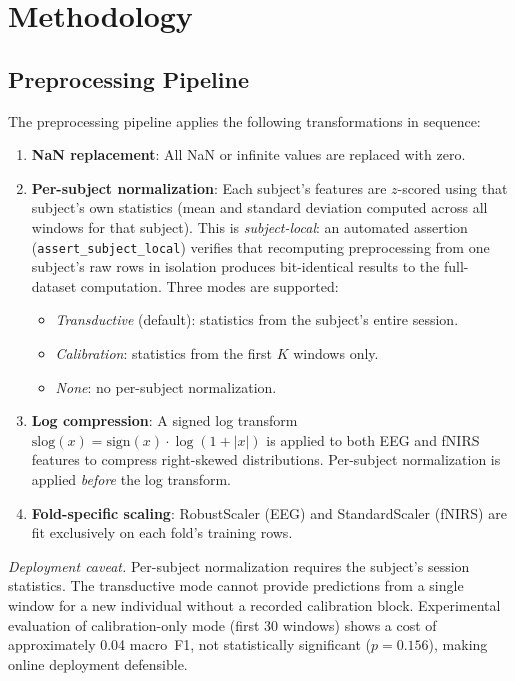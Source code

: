 \documentclass[conference]{IEEEtran}
\begin{document}
\section{Methodology}

\subsection{Preprocessing Pipeline}
The preprocessing pipeline applies the following transformations in sequence:
\begin{enumerate}
    \item \textbf{NaN replacement}: All NaN or infinite values are replaced with zero.
    \item \textbf{Per-subject normalization}: Each subject's features are $z$-scored using that subject's own statistics (mean and standard deviation computed across all windows for that subject). This is \emph{subject-local}: an automated assertion (\texttt{assert\_subject\_local}) verifies that recomputing preprocessing from one subject's raw rows in isolation produces bit-identical results to the full-dataset computation. Three modes are supported:
    \begin{itemize}
        \item \textit{Transductive} (default): statistics from the subject's entire session.
        \item \textit{Calibration}: statistics from the first $K$ windows only.
        \item \textit{None}: no per-subject normalization.
    \end{itemize}
    \item \textbf{Log compression}: A signed log transform $\mathrm{slog}(x) = \mathrm{sign}(x) \cdot \log(1 + |x|)$ is applied to both EEG and fNIRS features to compress right-skewed distributions. Per-subject normalization is applied \emph{before} the log transform.
    \item \textbf{Fold-specific scaling}: RobustScaler (EEG) and StandardScaler (fNIRS) are fit exclusively on each fold's training rows.
\end{enumerate}

\noindent\textit{Deployment caveat.} Per-subject normalization requires the subject's session statistics. The transductive mode cannot provide predictions from a single window for a new individual without a recorded calibration block. Experimental evaluation of calibration-only mode (first 30 windows) shows a cost of approximately 0.04 macro~F1, not statistically significant ($p = 0.156$), making online deployment defensible.
\end{document}
